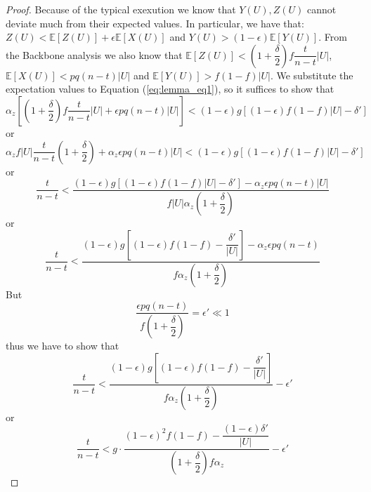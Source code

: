 \begin{proof}
Because of the typical exexution we know that $Y(U), Z(U)$ cannot deviate much from their expected values. In particular, we have that\cite{backbone}: $Z(U) < \mathbb{E}[Z(U)] + \epsilon \mathbb{E}[X(U)]$ and $Y(U) > (1-\epsilon)\mathbb{E}[Y(U)]$. From the Backbone analysis we also know that $\mathbb{E}[Z(U)] < (1+\dfrac{\delta}{2})f\dfrac{t}{n-t} \lvert U \rvert$, $\mathbb{E}[X(U)] < pq(n-t) \lvert U \rvert$ and $\mathbb{E}[Y(U)] > f(1-f) \lvert U \rvert$. We substitute the expectation values to Equation (\ref{eq:lemma_eq1}), so it suffices to show that
\begin{equation*}
    \alpha_z[(1+\dfrac{\delta}{2})f \dfrac{t}{n-t} \lvert U \rvert + \epsilon pq(n-t) \lvert U \rvert ] < (1- \epsilon)g[ (1-\epsilon)f(1-f) \lvert U \rvert - \delta' ]
\end{equation*} or
\begin{equation*}
        \alpha_z f \lvert U \rvert \dfrac{t}{n-t}(1 + \dfrac{\delta}{2}) + \alpha_z \epsilon pq(n-t) \lvert U \rvert < (1- \epsilon)g[ (1-\epsilon)f(1-f) \lvert U \rvert - \delta' ] 
\end{equation*} or
\begin{equation*}
        \dfrac{t}{n-t} < \dfrac{ (1- \epsilon)g[ (1-\epsilon)f(1-f) \lvert U \rvert - \delta' ] - \alpha_z \epsilon pq(n-t) \lvert U \rvert }  { f \lvert U \rvert \alpha_z (1 + \dfrac{\delta}{2})}
\end{equation*} or
\begin{equation*}
    \dfrac{t}{n-t} < \dfrac{  (1- \epsilon)g[ (1-\epsilon)f(1-f) - \dfrac{\delta'}{\lvert U \rvert} ] - \alpha_z \epsilon pq(n-t) }  { f \alpha_z (1 + \dfrac{\delta}{2})}
\end{equation*} But
\begin{equation*}
    \dfrac{\epsilon pq(n-t)}{f(1+\dfrac{\delta}{2})} = \epsilon' \ll 1
\end{equation*} thus we have to show that
\begin{equation*}
    \dfrac{t}{n-t} < \dfrac{  (1- \epsilon)g[ (1-\epsilon)f(1-f) - \dfrac{\delta'}{\lvert U \rvert} ] }  { f \alpha_z (1 + \dfrac{\delta}{2})} - \epsilon'
\end{equation*} or
\begin{equation}\label{eq:lemma_eq2}
    \dfrac{t}{n-t} < g \cdot \dfrac{(1-\epsilon)^2 f(1-f) - \dfrac{(1-\epsilon)\delta'}{\lvert U \rvert} }{(1+\dfrac{\delta}{2})f\alpha_z} - \epsilon'
\end{equation}


\end{proof}
